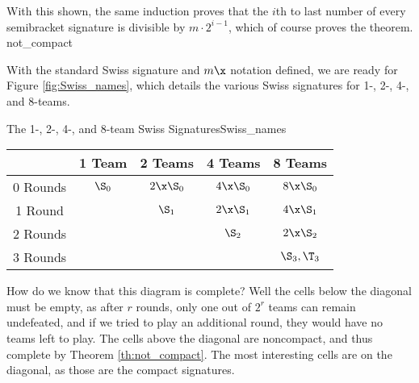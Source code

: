 {{        With this shown, the same induction proves that the $i$th to last number of every semibracket signature is divisible by $m \cdot 2^{i-1}$, which of course proves the theorem.
    }{not_compact}{\fried}


    With the standard Swiss signature and $m\x$ notation defined, we are ready for Figure \ref{fig:Swiss_names}, which details the various Swiss signatures for 1-, 2-, 4-, and 8-teams.

    \begin{figg}{The 1-, 2-, 4-, and 8-team Swiss Signatures}{Swiss_names}
        \begin{center}
            \begin{tabular}{ c | c | c | c | c}
                & 1 Team & 2 Teams & 4 Teams & 8 Teams\\
                \hline
                0 Rounds & $\S_0$ & $2\x\S_0$ & $4\x\S_0$ & $8\x\S_0$\\
                \hline
                1 Round & & $\S_1$ & $2\x\S_1$ & $4\x\S_1$\\
                \hline
                2 Rounds & & & $\S_2$ & $2\x\S_2$\\
                \hline
                \multirow{1}{*}{3 Rounds} & & & &  $\S_3, \T_3$ \\
            \end{tabular}
        \end{center}
        \end{figg}

    How do we know that this diagram is complete? Well the cells below the diagonal must be empty, as after $r$ rounds, only one out of $2^r$ teams can remain undefeated, and if we tried to play an additional round, they would have no teams left to play. The cells above the diagonal are noncompact, and thus complete by Theorem \ref{th:not_compact}. The most interesting cells are on the diagonal, as those are the compact signatures.

    }
